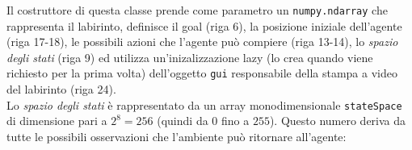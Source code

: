 Il costruttore di questa classe prende come parametro un \lstinline[style=cmd]|numpy.ndarray| che rappresenta il labirinto, definisce il goal (riga 6), la posizione iniziale dell'agente (riga 17-18), le possibili azioni che l'agente pu\`{o} compiere (riga 13-14), lo \textit{spazio degli stati} (riga 9) ed utilizza un'inizalizzazione lazy (lo crea quando viene richiesto per la prima volta) dell'oggetto \lstinline[style=cmd]|gui| responsabile della stampa a video del labirinto (riga 24). \\

Lo \textit{spazio degli stati} \`{e} rappresentato da un array monodimensionale \lstinline[style=cmd]|stateSpace| di dimensione pari a $2^8 = 256$ (quindi da $0$ fino a $255$). Questo numero deriva da tutte le possibili osservazioni che l'ambiente pu\`{o} ritornare all'agente:

